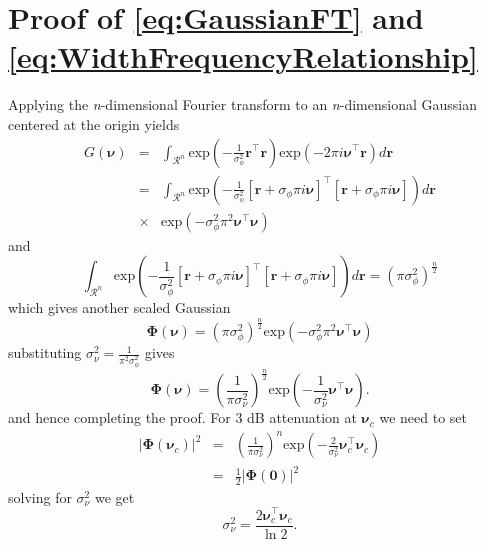 \documentclass[12pt]{iopart}
\begin{document}
\section{Proof of \ref{eq:GaussianFT} and \ref{eq:WidthFrequencyRelationship} }\label{ap:FrequencyAnalysis}
Applying the \textit{n}-dimensional Fourier transform \cite{Arsac1966} to an \textit{n}-dimensional Gaussian centered at the origin yields
\begin{eqnarray}
 G(\boldsymbol \nu)&=&\int_{\mathcal R^n}\mathrm{exp}\left({-\frac{1}{\sigma_{\phi}^2} \mathbf r^\top\mathbf r}\right)\mathrm{exp}\left(-2\pi i\boldsymbol\nu^\top\mathbf r\right)d\mathbf r \nonumber \\
&=&\int_{\mathcal R^n}\mathrm{exp}\left(-\frac{1}{\sigma_{\phi}^2}\left[\mathbf r +\sigma_{\phi}\pi i \boldsymbol\nu\right]^\top\left[\mathbf r +\sigma_{\phi}\pi i \boldsymbol\nu\right]\right)d\mathbf r \nonumber \\
&\times& \mathrm{exp}\left(-\sigma_{\phi}^2\pi^2\boldsymbol\nu^\top \boldsymbol\nu\right)
\end{eqnarray}
and 
\begin{equation}\label{eq:IntegralOfGaussian}
\int_{\mathcal R^n}\mathrm{exp}\left(-\frac{1}{\sigma_{\phi}^2}\left[\mathbf r +\sigma_{\phi}\pi i \boldsymbol\nu\right]^\top\left[\mathbf r +\sigma_{\phi}\pi i \boldsymbol\nu\right]\right)d\mathbf r=(\pi\sigma_{\phi}^2)^{\frac{n}{2}}
\end{equation}
which gives another scaled  Gaussian 
\begin{equation}
   \boldsymbol\Phi(\boldsymbol\nu)=(\pi\sigma_{\phi}^2)^{\frac{n}{2}}\mathrm{exp}\left(-\sigma_{\phi}^2\pi^2\boldsymbol\nu^\top \boldsymbol\nu\right)
\end{equation}
substituting $\sigma_{\nu}^2=\frac{1}{\pi^2\sigma_{\phi}^2}$ gives 
\begin{equation}
\boldsymbol\Phi(\boldsymbol \nu)=\left(\frac{1}{\pi\sigma_{\nu}^2}\right)^{\frac{n}{2}}\mathrm{exp}\left(-\frac{1}{\sigma_{\nu}^2}\boldsymbol\nu^\top \boldsymbol\nu\right).
\end{equation}
and hence completing the proof. For 3 dB attenuation at $\boldsymbol\nu_c$ we need to set
\begin{eqnarray}
 |\boldsymbol\Phi(\boldsymbol\nu_c)|^2&=&\left(\frac{1}{\pi\sigma_{\nu}^2}\right)^{n}\mathrm{exp}\left(-\frac{2}{\sigma_{\nu}^2}\boldsymbol\nu_c^\top \boldsymbol\nu_c\right)\\
&=&\frac{1}{2}|\boldsymbol\Phi(\mathbf 0)|^2
\end{eqnarray}
solving for $\sigma_{\nu}^2$ we get
\begin{equation}
 \sigma_{\nu}^2=\frac{2\boldsymbol\nu_c^\top \boldsymbol\nu_c}{\ln 2 }.
\end{equation}
\end{document}
